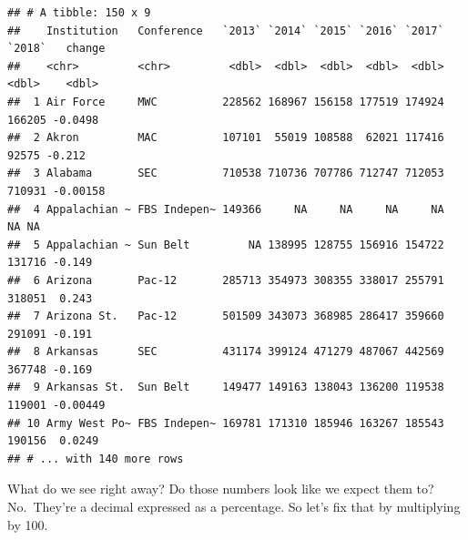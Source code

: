 \documentclass[]{book}
\newenvironment{Shaded}{\begin{snugshade}}{\end{snugshade}}
\newcommand{\DataTypeTok}[1]{\textcolor[rgb]{0.13,0.29,0.53}{#1}}
\newcommand{\DecValTok}[1]{\textcolor[rgb]{0.00,0.00,0.81}{#1}}
\newcommand{\KeywordTok}[1]{\textcolor[rgb]{0.13,0.29,0.53}{\textbf{#1}}}
\newcommand{\NormalTok}[1]{#1}
\newcommand{\OperatorTok}[1]{\textcolor[rgb]{0.81,0.36,0.00}{\textbf{#1}}}
\newcommand{\StringTok}[1]{\textcolor[rgb]{0.31,0.60,0.02}{#1}}
\begin{document}
\begin{Shaded}
\end{Shaded}

\begin{verbatim}
## # A tibble: 150 x 9
##    Institution   Conference   `2013` `2014` `2015` `2016` `2017` `2018`   change
##    <chr>         <chr>         <dbl>  <dbl>  <dbl>  <dbl>  <dbl>  <dbl>    <dbl>
##  1 Air Force     MWC          228562 168967 156158 177519 174924 166205 -0.0498 
##  2 Akron         MAC          107101  55019 108588  62021 117416  92575 -0.212  
##  3 Alabama       SEC          710538 710736 707786 712747 712053 710931 -0.00158
##  4 Appalachian ~ FBS Indepen~ 149366     NA     NA     NA     NA     NA NA      
##  5 Appalachian ~ Sun Belt         NA 138995 128755 156916 154722 131716 -0.149  
##  6 Arizona       Pac-12       285713 354973 308355 338017 255791 318051  0.243  
##  7 Arizona St.   Pac-12       501509 343073 368985 286417 359660 291091 -0.191  
##  8 Arkansas      SEC          431174 399124 471279 487067 442569 367748 -0.169  
##  9 Arkansas St.  Sun Belt     149477 149163 138043 136200 119538 119001 -0.00449
## 10 Army West Po~ FBS Indepen~ 169781 171310 185946 163267 185543 190156  0.0249 
## # ... with 140 more rows
\end{verbatim}

What do we see right away? Do those numbers look like we expect them to? No.~They're a decimal expressed as a percentage. So let's fix that by multiplying by 100.

\begin{Shaded}
\end{Shaded}
\end{document}
